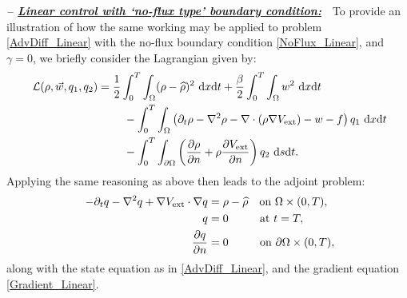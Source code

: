 \vspace{0.75em}

\textbf{\emph{-- \underline{Linear control with `no-flux type' boundary condition:}}}~~To provide an illustration of how the same working may be applied to problem \eqref{AdvDiff_Linear} with the no-flux boundary condition \eqref{NoFlux_Linear}, and $\gamma = 0$, we briefly consider the Lagrangian given by:
\begin{align*}
\ \mathcal{L}(\rho,\vec{w},\adj_1,\adj_2)={}&\frac{1}{2}\int_0^T\int_{\Omega}(\rho-\widehat{\rho})^2~{\rm d}x{\rm d}t+\frac{\beta}{2}\int_0^T\int_{\Omega}w^2~{\rm d}x{\rm d}t \\
\ &\quad-\int_0^T\int_{\Omega}\left(\partial_{t}\rho-\nabla^{2}\rho-\nabla\cdot(\rho\nabla{}V_{\text{ext}})-w-f\right)\adj_1~{\rm d}x{\rm d}t \\
\ &\quad-\int_0^T\int_{\partial\Omega}\left(\frac{\partial\rho}{\partial{}n}+\rho\frac{\partial{}V_{\text{ext}}}{\partial{}n}\right)\adj_2~{\rm d}s{\rm d}t.
\end{align*}
Applying the same reasoning as above then leads to the adjoint problem:
\begin{align*}
\ -\partial_{t}\adj-\nabla^{2}\adj+\nabla{}V_{\text{ext}}\cdot\nabla{}\adj={}&\rho-\widehat{\rho}\quad\text{on }\Omega\times(0,T), \\
\ \nonumber \adj={}&0\quad\hspace{1.8em}\text{at }t=T, \\
\ \nonumber \frac{\partial{}\adj}{\partial{}n}={}&0\quad\hspace{1.8em}\text{on }\partial\Omega\times(0,T),
\end{align*}
along with the state equation as in \eqref{AdvDiff_Linear}, and the gradient equation \eqref{Gradient_Linear}.


